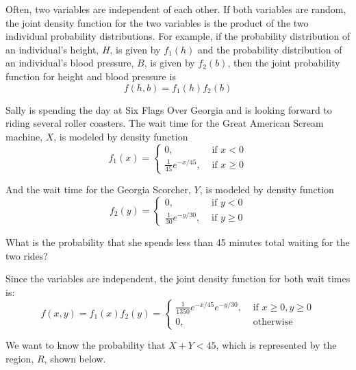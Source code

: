 Often, two variables are independent of each other. If both variables are 
random, the joint density function for the two variables is the product of the 
two individual probability distributions. For example, if the probability 
distribution of an individual's height, $H$, is given by $f_1(h)$ and the 
probability distribution of an individual's blood pressure, $B$, is given by 
$f_2(b)$, then the joint probability function for height and blood pressure is 
$$f(h, b) = f_1(h)f_2(b)$$

\begin{Worked}
\begin{Problem}
Sally is spending the day at Six Flags Over Georgia and is 
looking forward to riding several roller coasters. The wait time for the Great 
American Scream machine, $X$, is modeled by density 
function
$$f_1(x) = 
\begin{cases}
0,&\text{ if } x < 0\\
\frac{1}{45}e^{-x/45},&\text{ if } x \geq 0
\end{cases}$$

And the wait time for the Georgia Scorcher, $Y$, is modeled by density function
$$f_2(y) = 
\begin{cases}
0,&\text{ if } y < 0\\
\frac{1}{30}e^{-y/30},&\text{ if } y \geq 0
\end{cases}$$

What is the probability that she spends less than 45 minutes total waiting for 
the two rides?
\end{Problem}
\begin{Solution}
Since the variables are independent, the joint density 
function for both wait times is:
$$f(x, y) = f_1(x) f_2(y) = 
\begin{cases}
    \frac{1}{1350}e^{-x/45}e^{-y/30},& \text{ if } x \geq 0, y \geq 0\\
    0,&\text{ otherwise}
\end{cases}$$

We want to know the probability that $X + Y < 45$, which is represented by the 
region, $R$, shown below.

\begin{center}
\end{center}


\end{Solution}
\end{Worked}
